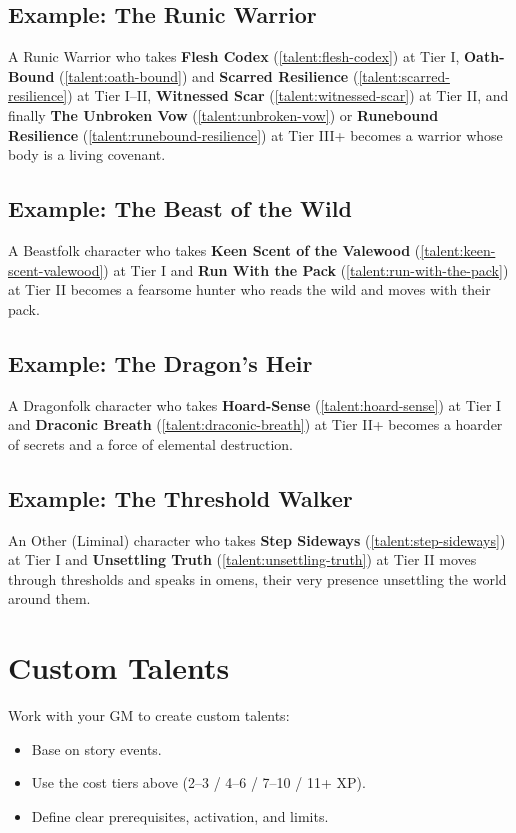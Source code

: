 \documentclass[12pt,a4paper]{book}
\begin{document}
\subsection*{Example: The Runic Warrior}
\label{sec:runic-warrior-example}
A Runic Warrior who takes \textbf{Flesh Codex} (\ref{talent:flesh-codex}) at Tier I, \textbf{Oath-Bound} (\ref{talent:oath-bound}) and \textbf{Scarred Resilience} (\ref{talent:scarred-resilience}) at Tier I--II, \textbf{Witnessed Scar} (\ref{talent:witnessed-scar}) at Tier II, and finally \textbf{The Unbroken Vow} (\ref{talent:unbroken-vow}) or \textbf{Runebound Resilience} (\ref{talent:runebound-resilience}) at Tier III+ becomes a warrior whose body is a living covenant.

\subsection*{Example: The Beast of the Wild}
\label{sec:beastfolk-example}
A Beastfolk character who takes \textbf{Keen Scent of the Valewood} (\ref{talent:keen-scent-valewood}) at Tier I and \textbf{Run With the Pack} (\ref{talent:run-with-the-pack}) at Tier II becomes a fearsome hunter who reads the wild and moves with their pack.

\subsection*{Example: The Dragon's Heir}
\label{sec:dragonfolk-example}
A Dragonfolk character who takes \textbf{Hoard-Sense} (\ref{talent:hoard-sense}) at Tier I and \textbf{Draconic Breath} (\ref{talent:draconic-breath}) at Tier II+ becomes a hoarder of secrets and a force of elemental destruction.

\subsection*{Example: The Threshold Walker}
\label{sec:other-example}
An Other (Liminal) character who takes \textbf{Step Sideways} (\ref{talent:step-sideways}) at Tier I and \textbf{Unsettling Truth} (\ref{talent:unsettling-truth}) at Tier II moves through thresholds and speaks in omens, their very presence unsettling the world around them.

\section{Custom Talents}
\label{sec:custom-talents}
Work with your GM to create custom talents:
\begin{itemize}
  \item Base on story events.
  \item Use the cost tiers above (2--3 / 4--6 / 7--10 / 11+ XP).
  \item Define clear prerequisites, activation, and limits.
\end{itemize}
\end{document}
